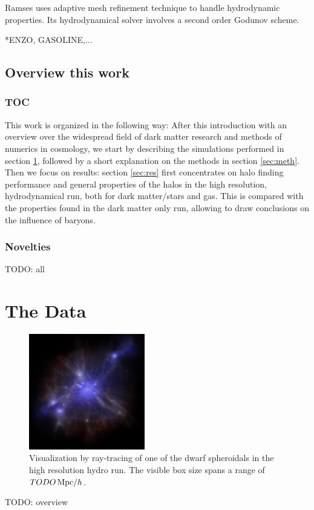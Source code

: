 \documentclass[useAMS,usenatbib]{mn2e}
\begin{document}
{\sc Ramses} \citep{TODO} uses adaptive mesh refinement technique to
handle hydrodynamic properties. Its hydrodynamical solver involves a
second order Godunov scheme.

*ENZO, GASOLINE,...
%		

\subsection{Overview this work}


\subsubsection{TOC}
This work is organized in the following way: After this introduction
with an overview over the widespread field of dark matter research and
methods of numerics in cosmology, we start by describing the
simulations performed in section \ref{sec:data}, followed by a short
explanation on the methods in section \ref{sec:meth}. Then we focus on
results: section \ref{sec:res} first concentrates on halo finding
performance and general properties of the halos in the high
resolution, hydrodynamical run, both for dark matter/stars and
gas. This is compared with the properties found in the dark matter
only run, allowing to draw conclusions on the influence of baryons.


\subsubsection{Novelties}
TODO: all


%
%
%
\section{The Data}
\label{sec:data}
\begin{figure}
  \begin{center}
    \includegraphics[width=0.45\textwidth]{fig/splotch/out.eps}
  \end{center}
  \caption{ \label{fig:splotch} Visualization by ray-tracing of one of the dwarf spheroidals in the high resolution hydro run. The visible box size spans a range of $TODO\,{\rm Mpc}/h$.}
\end{figure}
%
TODO: overview
\end{document}
